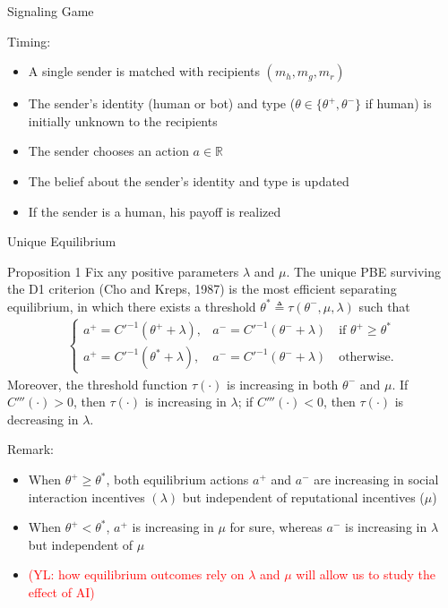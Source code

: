 \documentclass[9pt]{beamer}
\begin{document}
\begin{frame}{Signaling Game}

Timing:
\begin{itemize}\setlength{\itemsep}{1em}
    \item A single sender is matched with recipients $(m_h,m_g,m_r)$ 
    \item The sender's identity (human or bot) and type ($\theta\in \{\theta^+,\theta^-\}$ if human) is initially unknown to the recipients
    \item The sender chooses an action $a\in \mathbb{R}$
    \item The belief about the sender's identity and type is updated
    \item If the sender is a human, his payoff is realized
\end{itemize}

\end{frame}



\begin{frame}{Unique Equilibrium}\label{prop1}
\begin{exampleblock}{Proposition 1}
    Fix any positive parameters $\lambda$ and $\mu$. The unique PBE surviving the D1 criterion (Cho and Kreps, 1987) is the most efficient separating equilibrium, in which there exists a threshold $\theta^*\triangleq\tau(\theta^-,\mu,\lambda)$ such that
    \begin{align*}
    \begin{cases}
        a^+ = C'^{-1}(\theta^++\lambda), &a^- = C'^{-1}(\theta^-+\lambda)  \quad\text{if } \theta^+\geq \theta^*\\ 
        a^+ = C'^{-1}(\theta^*+\lambda), &a^- = C'^{-1}(\theta^-+\lambda)     \quad\text{otherwise.}
    \end{cases}
    \end{align*}
    Moreover, the threshold function $\tau(\cdot)$ is increasing in both $\theta^-$ and $\mu$. If $C'''(\cdot)>0$, then $\tau(\cdot)$ is increasing in $\lambda$; if $C'''(\cdot)<0$, then $\tau(\cdot)$ is decreasing in $\lambda$.
\end{exampleblock}
\vspace{1em}

Remark:
\begin{itemize}\setlength{\itemsep}{.5em}
    \item When $\theta^+\geq \theta^*$, both equilibrium actions $a^+$ and $a^-$ are increasing in social interaction incentives $(\lambda)$ but independent of reputational incentives ($\mu$)
    \item When $\theta^+<\theta^*$, $a^+$ is increasing in $\mu$ for sure, whereas $a^-$ is increasing in $\lambda$ but independent of $\mu$
    \item \textcolor{red}{(YL: how equilibrium outcomes rely on $\lambda$ and $\mu$ will allow us to study the effect of AI)}
\end{itemize}

\vspace{.5em}
\hyperlink{proof_prop1}{}

\end{frame}
\end{document}
